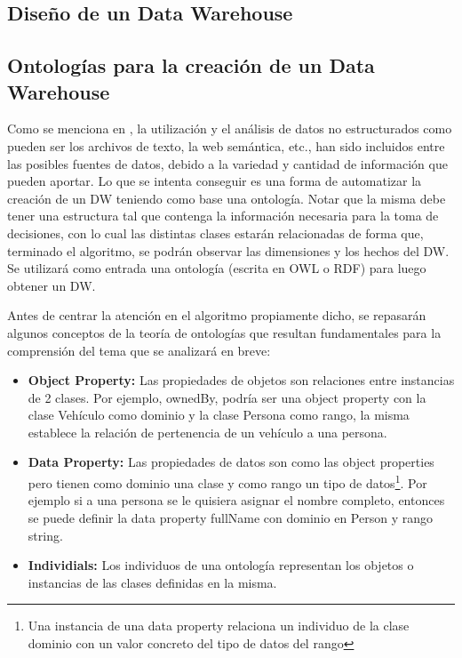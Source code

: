 \documentclass[a4paper,11pt]{article}
\begin{document}
    \subsection{Diseño de un Data Warehouse} 
    
    
    \subsection{Ontologías para la creación de un Data Warehouse}
    
    Como se menciona en \cite{ontologias}, la utilización y el análisis de datos no estructurados como pueden ser los archivos de texto, la web
    semántica, etc., han sido incluidos entre las posibles fuentes de datos, debido a la variedad y cantidad de información que pueden aportar. Lo que
    se intenta conseguir es una forma de automatizar la creación de un DW teniendo como base una ontología. Notar que la misma debe tener una
    estructura tal que contenga la información necesaria para la toma de decisiones, con lo cual las distintas clases estarán relacionadas de forma
    que, terminado el algoritmo, se podrán observar las dimensiones y los hechos del DW. Se utilizará como entrada una ontología (escrita en OWL o RDF)
    para luego obtener un DW.\par
    
    Antes de centrar la atención en el algoritmo propiamente dicho, se repasarán algunos conceptos de la teoría de ontologías que resultan fundamentales
    para la comprensión del tema que se analizará en breve:
    
    \begin{itemize}
      \item \textbf{Object Property:} Las propiedades de objetos son relaciones entre instancias de 2 clases. Por ejemplo, ownedBy, podría ser una
      object property con la clase Vehículo como dominio y la clase Persona como rango, la misma establece la relación de pertenencia de un vehículo a
      una persona.
      \item \textbf{Data Property:} Las propiedades de datos son como las object properties pero tienen como dominio una clase y como rango un tipo de
      datos\footnote{Una instancia de una data property relaciona un individuo de la clase dominio con un valor concreto del tipo de datos del rango}.
      Por ejemplo si a una persona se le quisiera asignar el nombre completo, entonces se puede definir la data property fullName con dominio en Person
      y rango string.
      \item \textbf{Individials:} Los individuos de una ontología representan los objetos o instancias de las clases definidas en la misma.
    \end{itemize}
    
\end{document}
